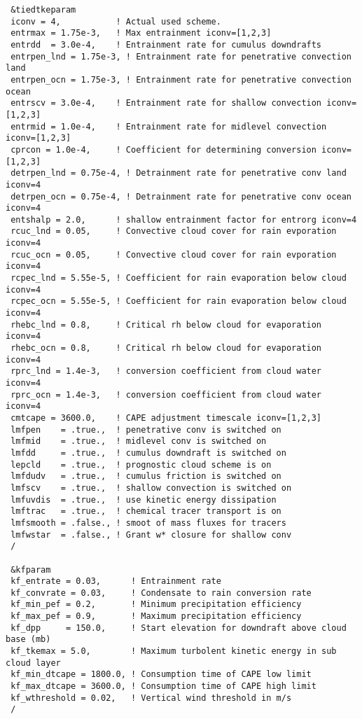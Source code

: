 {\begin{Verbatim}
 &tiedtkeparam
 iconv = 4,           ! Actual used scheme.
 entrmax = 1.75e-3,   ! Max entrainment iconv=[1,2,3]
 entrdd  = 3.0e-4,    ! Entrainment rate for cumulus downdrafts
 entrpen_lnd = 1.75e-3, ! Entrainment rate for penetrative convection land
 entrpen_ocn = 1.75e-3, ! Entrainment rate for penetrative convection ocean
 entrscv = 3.0e-4,    ! Entrainment rate for shallow convection iconv=[1,2,3]
 entrmid = 1.0e-4,    ! Entrainment rate for midlevel convection iconv=[1,2,3]
 cprcon = 1.0e-4,     ! Coefficient for determining conversion iconv=[1,2,3]
 detrpen_lnd = 0.75e-4, ! Detrainment rate for penetrative conv land iconv=4
 detrpen_ocn = 0.75e-4, ! Detrainment rate for penetrative conv ocean iconv=4
 entshalp = 2.0,      ! shallow entrainment factor for entrorg iconv=4
 rcuc_lnd = 0.05,     ! Convective cloud cover for rain evporation iconv=4
 rcuc_ocn = 0.05,     ! Convective cloud cover for rain evporation iconv=4
 rcpec_lnd = 5.55e-5, ! Coefficient for rain evaporation below cloud iconv=4
 rcpec_ocn = 5.55e-5, ! Coefficient for rain evaporation below cloud iconv=4
 rhebc_lnd = 0.8,     ! Critical rh below cloud for evaporation iconv=4
 rhebc_ocn = 0.8,     ! Critical rh below cloud for evaporation iconv=4
 rprc_lnd = 1.4e-3,   ! conversion coefficient from cloud water iconv=4
 rprc_ocn = 1.4e-3,   ! conversion coefficient from cloud water iconv=4
 cmtcape = 3600.0,    ! CAPE adjustment timescale iconv=[1,2,3]
 lmfpen    = .true.,  ! penetrative conv is switched on
 lmfmid    = .true.,  ! midlevel conv is switched on
 lmfdd     = .true.,  ! cumulus downdraft is switched on
 lepcld    = .true.,  ! prognostic cloud scheme is on
 lmfdudv   = .true.,  ! cumulus friction is switched on
 lmfscv    = .true.,  ! shallow convection is switched on
 lmfuvdis  = .true.,  ! use kinetic energy dissipation
 lmftrac   = .true.,  ! chemical tracer transport is on
 lmfsmooth = .false., ! smoot of mass fluxes for tracers
 lmfwstar  = .false., ! Grant w* closure for shallow conv
 /

 &kfparam
 kf_entrate = 0.03,      ! Entrainment rate
 kf_convrate = 0.03,     ! Condensate to rain conversion rate
 kf_min_pef = 0.2,       ! Minimum precipitation efficiency
 kf_max_pef = 0.9,       ! Maximum precipitation efficiency
 kf_dpp     = 150.0,     ! Start elevation for downdraft above cloud base (mb)
 kf_tkemax = 5.0,        ! Maximum turbolent kinetic energy in sub cloud layer
 kf_min_dtcape = 1800.0, ! Consumption time of CAPE low limit
 kf_max_dtcape = 3600.0, ! Consumption time of CAPE high limit
 kf_wthreshold = 0.02,   ! Vertical wind threshold in m/s
 /
\end{Verbatim}
}

